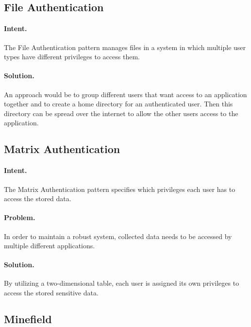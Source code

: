 \subsection{File Authentication~\cite{Ali2018}} 
\label{p:fac}

\paragraph{\textbf{Intent.}} The File Authentication pattern manages files in a system in which multiple user types have different privileges to access them.

\paragraph{\textbf{Solution.}} An approach would be to group different users that want access to an application together and to create a home directory for an authenticated user. Then this directory can be spread over the internet to allow the other users access to the application.


\subsection{Matrix Authentication~\cite{Ali2018}} 
\label{p:mac}

\paragraph{\textbf{Intent.}} The Matrix Authentication pattern specifies which privileges each user has to access the stored data.

\paragraph{\textbf{Problem.}} In order to maintain a robust system, collected data needs to be accessed by multiple different applications. 

\paragraph{\textbf{Solution.}} By utilizing a two-dimensional table, each user is assigned its own privileges to access the stored sensitive data.


\subsection{Minefield~\cite{Kienzle2006}} 
\label{p:mine}


